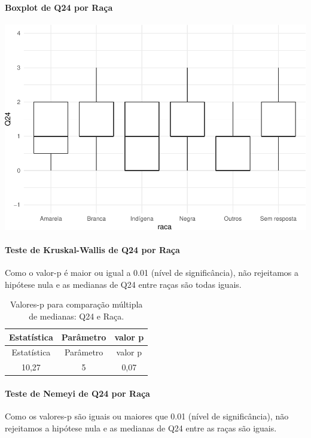 \documentclass[]{article}
\let\oldparagraph\paragraph
\renewcommand{\paragraph}[1]{\oldparagraph{#1}\mbox{}}
\begin{document}
\hypertarget{boxplot-de-q24-por-rauxe7a}{%
\paragraph{Boxplot de Q24 por Raça}\label{boxplot-de-q24-por-rauxe7a}}

\begin{center}\includegraphics[width=0.75\linewidth]{relatorio_covid19_files/figure-latex/unnamed-chunk-638-1} \end{center}

\hypertarget{teste-de-kruskal-wallis-de-q24-por-rauxe7a}{%
\paragraph{Teste de Kruskal-Wallis de Q24 por Raça}\label{teste-de-kruskal-wallis-de-q24-por-rauxe7a}}

Como o valor-p é maior ou igual a 0.01 (nível de significância), não rejeitamos a hipótese nula e as medianas de Q24 entre raças são todas iguais.

\begin{longtable}[]{@{}ccc@{}}
\caption{\label{tab:unnamed-chunk-640}Valores-p para comparação múltipla de medianas: Q24 e Raça.}\tabularnewline
\toprule
Estatística & Parâmetro & valor p\tabularnewline
\midrule
\endfirsthead
\toprule
Estatística & Parâmetro & valor p\tabularnewline
\midrule
\endhead
10,27 & 5 & 0,07\tabularnewline
\bottomrule
\end{longtable}

\hypertarget{teste-de-nemeyi-de-q24-por-rauxe7a}{%
\paragraph{Teste de Nemeyi de Q24 por Raça}\label{teste-de-nemeyi-de-q24-por-rauxe7a}}

Como os valores-p são iguais ou maiores que 0.01 (nível de significância), não rejeitamos a hipótese nula e as medianas de Q24 entre as raças são iguais.
\end{document}
